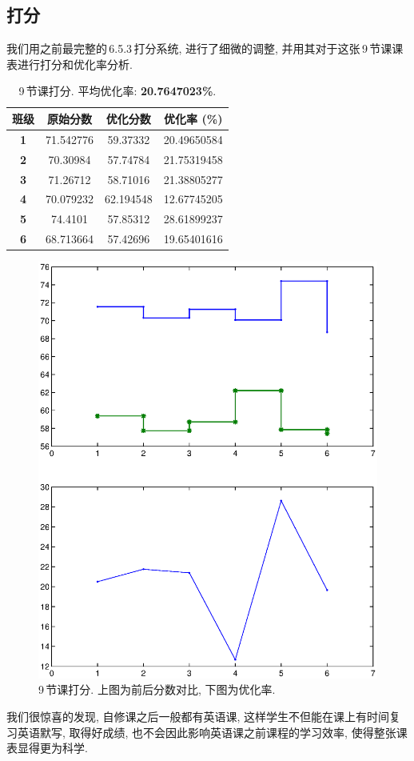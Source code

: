\documentclass[a4paper]{article}
\begin{document}
 \subsection{打分}
  我们用之前最完整的\,6.5.3\,打分系统, 进行了细微的调整, 并用其对于这张\,9\,节课课表进行打分和优化率分析.
  \begin{table}[H]
  \centering
  \begin{tabular}{|c|c|c|c|}
  \hline
  \bf 班级 & \bf 原始分数 & \bf 优化分数 & \bf 优化率 (\%) \\\hline
  \bf 1 & 71.542776 & 59.37332 & 20.49650584 \\\hline
  \bf 2 & 70.30984 & 57.74784 & 21.75319458 \\\hline
  \bf 3 & 71.26712 & 58.71016 & 21.38805277 \\\hline
  \bf 4 & 70.079232 & 62.194548 & 12.67745205 \\\hline
  \bf 5 & 74.4101 & 57.85312 & 28.61899237 \\\hline
  \bf 6 & 68.713664 & 57.42696 & 19.65401616 \\\hline
  \end{tabular}
  \caption{9\,节课打分. 平均优化率: \textbf{20.7647023\%}.}
  \end{table}
  \begin{figure}[H]
  \centerline{\includegraphics[scale=0.7]{9lessons.eps}}
  \caption{9\,节课打分. 上图为前后分数对比, 下图为优化率.}
  \end{figure}
  我们很惊喜的发现, 自修课之后一般都有英语课, 这样学生不但能在课上有时间复习英语默写, 取得好成绩, 也不会因此影响英语课之前课程的学习效率, 使得整张课表显得更为科学.
\end{document}
